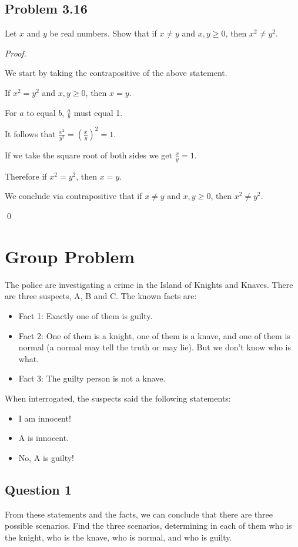\documentclass{article}
\begin{document}
\pagebreak
\subsection{Problem 3.16}
Let $x$ and $y$ be real numbers. Show that if $x \neq y$ and $x,y \geq 0$, then $x^2 \neq y^2$.

\textit{Proof.}
\begin{addmargin}[0.75cm]{0cm}
	We start by taking the contrapositive of the above statement.
	
	If $x^2 = y^2$ and $x,y \geq 0$, then $x = y$.
	
	For $a$ to equal $b$, $\frac{a}{b}$ must equal 1.
	
	It follows that $\frac{x^2}{y^2}=(\frac{x}{y})^2=1$.
	
	If we take the square root of both sides we get $\frac{x}{y}=1$.
	
	Therefore if $x^2=y^2$, then $x=y$.
	
	We conclude via contrapositive that if $x \neq y$ and $x,y \geq 0$, then $x^2 \neq y^2$.
	
	\qed
\end{addmargin}


\pagebreak
\section{Group Problem}
The police are investigating a crime in the Island of Knights and Knaves. There are three suspects, A, B and C. The known facts are:

\begin{itemize}[noitemsep, nolistsep]
	\item Fact 1: Exactly one of them is guilty.
	\item Fact 2: One of them is a knight, one of them is a knave, and one of them is normal (a normal may tell the truth or may lie). But we don't know who is what.
	\item Fact 3: The guilty person is not a knave.
\end{itemize}

When interrogated, the suspects said the following statements:
\begin{itemize}[noitemsep, nolistsep]
	\item I am innocent!
	\item A is innocent.
	\item No, A is guilty!
\end{itemize}

\subsection{Question 1} 
From these statements and the facts, we can conclude that there are three possible scenarios. Find the three scenarios, determining in each of them who is the knight, who is the knave, who is normal, and who is guilty.
\end{document}
